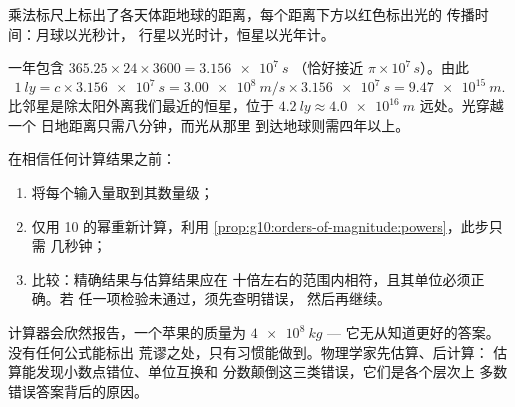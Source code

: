 \begin{omfigure}

{\small 乘法标尺上标出了各天体距地球的距离，每个距离下方以红色标出光的
传播时间：月球以光秒计，
行星以光时计，恒星以光年计。}
\end{omfigure}

\begin{example}[光年的米数]\label{ex:g10:orders-of-magnitude:ly}
一年包含 $365.25 \times 24 \times 3600 = \qty{3.156e7}{s}$
（恰好接近 $\pi \times 10^{7}\,\unit{s}$）。由此
\[
\qty{1}{ly} = c \times \qty{3.156e7}{s}
= \qty{3.00e8}{m/s} \times \qty{3.156e7}{s}
= \qty{9.47e15}{m}.
\]
比邻星是除太阳外离我们最近的恒星，位于
$\qty{4.2}{ly} \approx \qty{4.0e16}{m}$ 远处。光穿越一个
日地距离只需八分钟，而光从那里
到达地球则需四年以上。
\end{example}

\begin{method}[数量级的合理性检验]\label{met:g10:orders-of-magnitude:sanity}
在相信任何计算结果之前：
\begin{enumerate}
  \item 将每个输入量取到其数量级；
  \item 仅用 10 的幂重新计算，利用
        \cref{prop:g10:orders-of-magnitude:powers}，此步只需
        几秒钟；
  \item 比较：精确结果与估算结果应在
        十倍左右的范围内相符，且其单位必须正确。若
        任一项检验未通过，须先查明错误，
        然后再继续。
\end{enumerate}
\end{method}

\begin{remark}[何必费心]\label{rem:g10:orders-of-magnitude:sanity}
计算器会欣然报告，一个苹果的质量为
$\qty{4e8}{kg}$ --- 它无从知道更好的答案。没有任何公式能标出
荒谬之处，只有习惯能做到。物理学家先估算、后计算：
估算能发现小数点错位、单位互换和
分数颠倒这三类错误，它们是各个层次上
多数错误答案背后的原因。
\end{remark}

